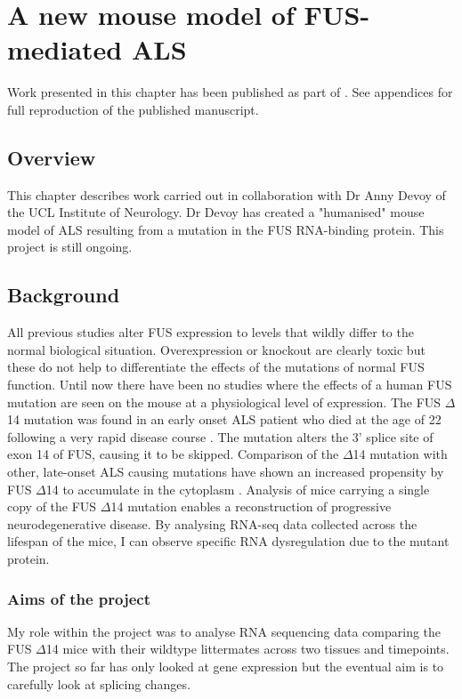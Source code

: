 \chapter{A new mouse model of FUS-mediated ALS}
\label{chapter:fus_mouse}

Work presented in this chapter has been published as part of \citep{Devoy2017}. See appendices for full reproduction of the published manuscript.


\section{Overview}
This chapter describes work carried out in collaboration with Dr Anny Devoy of the UCL Institute of Neurology. Dr Devoy has created a "humanised" mouse model of ALS resulting from a mutation in the FUS RNA-binding protein. This project is still ongoing.

\section{Background}
All previous studies alter FUS expression to levels that wildly differ to the normal biological situation. Overexpression or knockout are clearly toxic but these do not help to differentiate the effects of the mutations of normal FUS function. Until now there have been no studies where the effects of a human FUS mutation are seen on the mouse at a physiological level of expression. 
The FUS $\Delta$14 mutation was found in an early onset ALS patient who died at the age of 22 following a very rapid disease course \citep{DeJesus-Hernandez2010}. The mutation alters the 3' splice site of exon 14 of FUS, causing it to be skipped.  Comparison of the $\Delta$14 mutation with other, late-onset ALS causing mutations have shown an increased propensity by FUS $\Delta$14 to accumulate in the cytoplasm \citep{Verbeeck2012}. Analysis of mice carrying a single copy of the FUS $\Delta$14 mutation enables a reconstruction of progressive neurodegenerative disease. By analysing RNA-seq data collected across the lifespan of the mice, I can observe specific RNA dysregulation due to the mutant protein.

\subsection{Aims of the project}
My role within the project was to analyse RNA sequencing data comparing the FUS $\Delta$14 mice with their wildtype littermates across two tissues and timepoints. The project so far has only looked at gene expression but the eventual aim is to carefully look at splicing changes.



